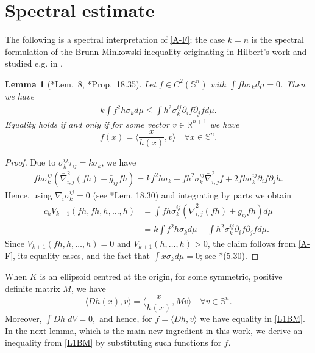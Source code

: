 \documentclass[12pt]{amsart}
\newtheorem{lemma}[theorem]{Lemma}
\theoremstyle{definition}
\numberwithin{equation}{section}
\newcommand{\Sn}{\mathbb{S}^n}
\theoremstyle{remark}
\numberwithin{equation}{section}
\begin{document}
\section{Spectral estimate}

The following is a spectral interpretation of \eqref{A-F}; the case $k=n$ is the spectral formulation of the Brunn-Minkowski inequality originating in Hilbert's work and studied e.g. in \cites{KM22,Mil21}. 

\begin{lemma}[\cite{An97}*{Lem.~8}, \cite{ACGL20}*{Prop.~18.35}] \label{local Vk ineq}
Let $f\in C^2(\Sn)$ with $\int fh\sigma_kd\mu=0$. Then we have
\begin{align}\label{L1BM}
k\int f^2h\sigma_kd\mu\leq \int h^2\sigma_k^{ij}\partial_if\partial_jfd\mu.
\end{align}
Equality holds if and only if for some vector $v\in \mathbb{R}^{n+1}$ we have
\[f(x)=\langle \frac{x}{h(x)},v \rangle\quad \forall x\in \Sn.\]
\end{lemma}
\begin{proof} Due to $\sigma_k^{ij} \tau_{ij} = k \sigma_k$, we have
\begin{align*}
fh \sigma_{k}^{ij}(\bar{\nabla}^2_{i,j}(fh)+\bar{g}_{ij}fh)=kf^2h\sigma_k+fh^2\sigma_{k}^{ij}\bar{\nabla}^2_{i,j}f+2fh\sigma_{k}^{ij}\partial_if\partial_jh.
\end{align*}
Hence, using $\bar{\nabla}_i\sigma_k^{ij}=0$ (see \cite{ACGL20}*{Lem. 18.30}) and integrating by parts we obtain
\begin{align*}
c_kV_{k+1}(fh,fh,h,\ldots,h)&=\int fh \sigma_{k}^{ij}(\bar{\nabla}^2_{i,j}(fh)+\bar{g}_{ij}fh)d\mu\\
&=k\int f^2h\sigma_k d\mu-\int h^2\sigma_k^{ij}\partial_if\partial_jfd\mu.
\end{align*}
Since $V_{k+1}(fh,h,\ldots,h)=0$ and $V_{k+1}(h,\ldots,h) > 0$, the claim follows from \eqref{A-F}, its equality cases, and the fact that $\int x \sigma_k d\mu = 0$; see \cite{Sch14}*{(5.30)}.
\end{proof}

When $K$ is an ellipsoid centred at the origin, for some symmetric, positive definite matrix $M$, we have
\[\langle Dh(x), v\rangle =\langle\frac{x}{h(x)},M v\rangle \quad \forall v\in \Sn.\]
Moreover, $\int Dh \; dV=0,$ and
hence, for $f=\langle Dh, v\rangle$ we have equality in \eqref{L1BM}. In the next lemma, which is the main new ingredient in this work, we derive an inequality from \eqref{L1BM} by substituting such functions for $f$.
\end{document}
